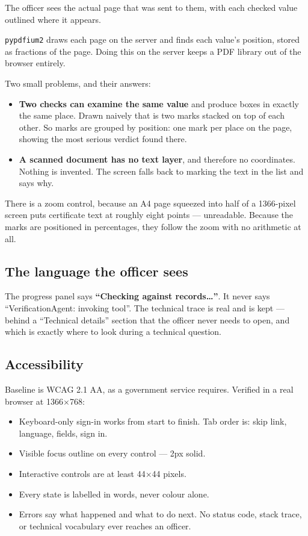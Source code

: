 \documentclass[11pt,a4paper]{article}
\begin{document}
The officer sees the actual page that was sent to them, with each checked value
outlined where it appears.

\texttt{pypdfium2} draws each page on the server and finds each value's
position, stored as fractions of the page. Doing this on the server keeps a PDF
library out of the browser entirely.

Two small problems, and their answers:

\begin{itemize}
  \item \textbf{Two checks can examine the same value} and produce boxes in
        exactly the same place. Drawn naively that is two marks stacked on top of
        each other. So marks are grouped by position: one mark per place on the
        page, showing the most serious verdict found there.
  \item \textbf{A scanned document has no text layer}, and therefore no
        coordinates. Nothing is invented. The screen falls back to marking the
        text in the list and says why.
\end{itemize}

There is a zoom control, because an A4 page squeezed into half of a 1366-pixel
screen puts certificate text at roughly eight points --- unreadable. Because the
marks are positioned in percentages, they follow the zoom with no arithmetic at
all.

\subsection{The language the officer sees}

The progress panel says \textbf{``Checking against records\ldots{}''}. It never
says ``VerificationAgent: invoking tool''. The technical trace is real and is
kept --- behind a ``Technical details'' section that the officer never needs to
open, and which is exactly where to look during a technical question.

\subsection{Accessibility}

Baseline is WCAG 2.1 AA, as a government service requires. Verified in a real
browser at 1366$\times$768:

\begin{itemize}
  \item Keyboard-only sign-in works from start to finish. Tab order is: skip
        link, language, fields, sign in.
  \item Visible focus outline on every control --- 2px solid.
  \item Interactive controls are at least 44$\times$44 pixels.
  \item Every state is labelled in words, never colour alone.
  \item Errors say what happened and what to do next. No status code, stack
        trace, or technical vocabulary ever reaches an officer.
\end{itemize}
\end{document}
